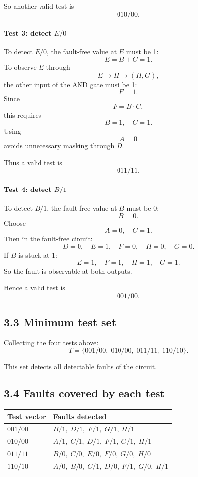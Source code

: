 \documentclass[11pt,a4paper]{article}
\begin{document}
So another valid test is
\[
\boxed{010/00}.
\]

\paragraph{Test 3: detect $E/0$}
To detect $E/0$, the fault-free value at $E$ must be 1:
\[
E=B+C=1.
\]
To observe $E$ through
\[
E \rightarrow H \rightarrow (H,G),
\]
the other input of the AND gate must be 1:
\[
F=1.
\]
Since
\[
F=B\cdot C,
\]
this requires
\[
B=1,\quad C=1.
\]
Using
\[
A=0
\]
avoids unnecessary masking through $D$.

Thus a valid test is
\[
\boxed{011/11}.
\]

\paragraph{Test 4: detect $B/1$}
To detect $B/1$, the fault-free value at $B$ must be 0:
\[
B=0.
\]
Choose
\[
A=0,\quad C=1.
\]
Then in the fault-free circuit:
\[
D=0,\quad E=1,\quad F=0,\quad H=0,\quad G=0.
\]
If $B$ is stuck at 1:
\[
E=1,\quad F=1,\quad H=1,\quad G=1.
\]
So the fault is observable at both outputs.

Hence a valid test is
\[
\boxed{001/00}.
\]

\subsection*{3.3 Minimum test set}
Collecting the four tests above:
\[
\boxed{
T=\{001/00,\;010/00,\;011/11,\;110/10\}.
}
\]

This set detects all detectable faults of the circuit.

\subsection*{3.4 Faults covered by each test}
\begin{center}
\begin{tabular}{ll}
\toprule
Test vector & Faults detected \\
\midrule
$001/00$ & $B/1,\; D/1,\; F/1,\; G/1,\; H/1$ \\
$010/00$ & $A/1,\; C/1,\; D/1,\; F/1,\; G/1,\; H/1$ \\
$011/11$ & $B/0,\; C/0,\; E/0,\; F/0,\; G/0,\; H/0$ \\
$110/10$ & $A/0,\; B/0,\; C/1,\; D/0,\; F/1,\; G/0,\; H/1$ \\
\bottomrule
\end{tabular}
\end{center}
\end{document}
